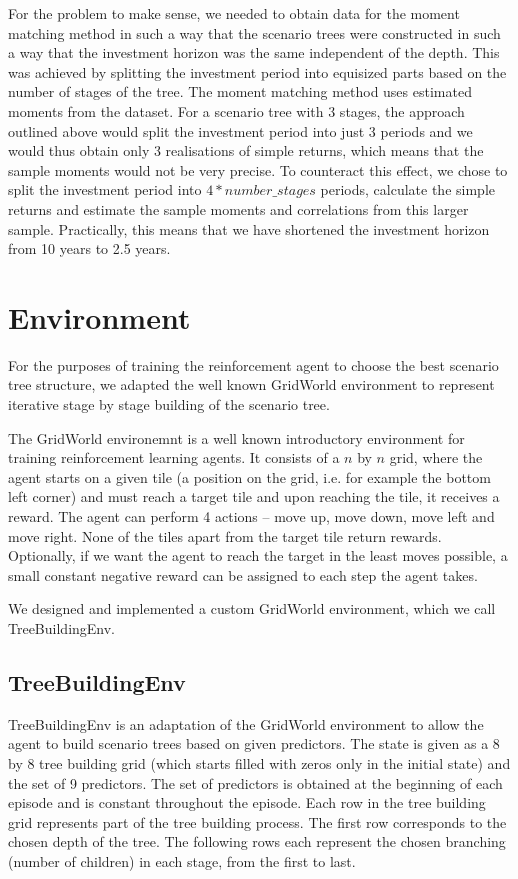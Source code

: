 For the problem to make sense, we needed to obtain data for the moment matching method in such a way that the scenario trees were constructed in such a way that the investment horizon was the same independent of the depth. This was achieved by splitting the investment period into equisized parts based on the number of stages of the tree.
The moment matching method uses estimated moments from the dataset. For a scenario tree with 3 stages, the approach outlined above would split the investment period into just 3 periods and we would thus obtain only 3 realisations of simple returns, which means that the sample moments would not be very precise. To counteract this effect, we chose to split the investment period into $4*number\_stages$ periods, calculate the simple returns and estimate the sample moments and correlations from this larger sample. Practically, this means that we have shortened the investment horizon from 10 years to 2.5 years. 

\section{Environment}
For the purposes of training the reinforcement agent to choose the best scenario tree structure, we adapted the well known GridWorld environment to represent iterative stage by stage building of the scenario tree.
\begin{rem}
The GridWorld environemnt is a well known introductory environment for training reinforcement learning agents. It consists of a $n$ by $n$ grid, where the agent starts on a given tile (a position on the grid, i.e. for example the bottom left corner) and must reach a target tile and upon reaching the tile, it receives a reward. The agent can perform 4 actions -- move up, move down, move left and move right. None of the tiles apart from the target tile return rewards. Optionally, if we want the agent to reach the target in the least moves possible, a small constant negative reward can be assigned to each step the agent takes.
\end{rem}
We designed and implemented a custom GridWorld environment, which we call TreeBuildingEnv.

\subsection{TreeBuildingEnv}
TreeBuildingEnv is an adaptation of the GridWorld environment to allow the agent to build scenario trees based on given predictors. 
The state is given as a 8 by 8 tree building grid (which starts filled with zeros only in the initial state) and the set of 9 predictors. The set of predictors is obtained at the beginning of each episode and is constant throughout the episode. Each row in the tree building grid represents part of the tree building process. The first row corresponds to the chosen depth of the tree. The following rows each represent the chosen branching (number of children) in each stage, from the first to last.

